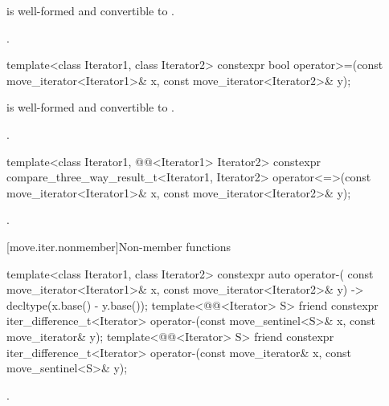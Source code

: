 \begin{itemdescr}
\pnum
\constraints
{} is well-formed and
convertible to .

\pnum
\returns
{}.
\end{itemdescr}

%
\begin{itemdecl}
template<class Iterator1, class Iterator2>
constexpr bool operator>=(const move_iterator<Iterator1>& x, const move_iterator<Iterator2>& y);
\end{itemdecl}

\begin{itemdescr}
\pnum
\constraints
{} is well-formed and
convertible to .

\pnum
\returns
{}.
\end{itemdescr}

%
\begin{itemdecl}
template<class Iterator1, @@<Iterator1> Iterator2>
  constexpr compare_three_way_result_t<Iterator1, Iterator2>
    operator<=>(const move_iterator<Iterator1>& x,
                const move_iterator<Iterator2>& y);
\end{itemdecl}

\begin{itemdescr}
\pnum
\returns
{}.
\end{itemdescr}

[move.iter.nonmember]{Non-member functions}

%
\begin{itemdecl}
template<class Iterator1, class Iterator2>
  constexpr auto operator-(
    const move_iterator<Iterator1>& x, const move_iterator<Iterator2>& y)
      -> decltype(x.base() - y.base());
template<@@<Iterator> S>
  friend constexpr iter_difference_t<Iterator>
    operator-(const move_sentinel<S>& x, const move_iterator& y);
template<@@<Iterator> S>
  friend constexpr iter_difference_t<Iterator>
    operator-(const move_iterator& x, const move_sentinel<S>& y);
\end{itemdecl}

\begin{itemdescr}
\pnum
\returns
{}.
\end{itemdescr}

